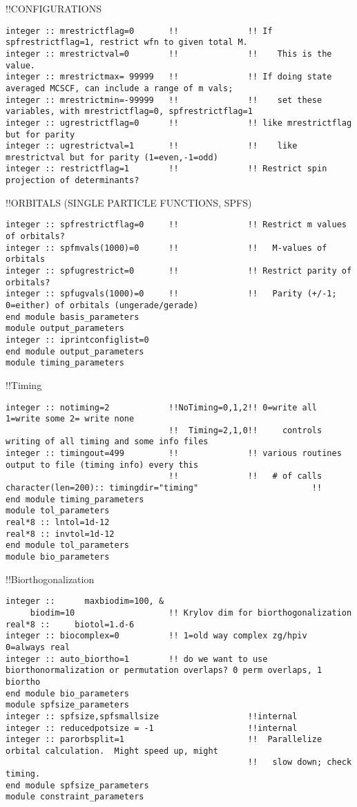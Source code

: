 !!{\large \quad CONFIGURATIONS}
\begin{verbatim}
integer :: mrestrictflag=0       !!              !! If spfrestrictflag=1, restrict wfn to given total M.
integer :: mrestrictval=0        !!              !!    This is the value.
integer :: mrestrictmax= 99999   !!              !! If doing state averaged MCSCF, can include a range of m vals;
integer :: mrestrictmin=-99999   !!              !!    set these variables, with mrestrictflag=0, spfrestrictflag=1
integer :: ugrestrictflag=0      !!              !! like mrestrictflag but for parity
integer :: ugrestrictval=1       !!              !!    like mrestrictval but for parity (1=even,-1=odd)
integer :: restrictflag=1        !!              !! Restrict spin projection of determinants?
\end{verbatim}
!!{\large \quad ORBITALS (SINGLE PARTICLE FUNCTIONS, SPFS)}
\begin{verbatim}
integer :: spfrestrictflag=0     !!              !! Restrict m values of orbitals?  
integer :: spfmvals(1000)=0      !!              !!   M-values of orbitals 
integer :: spfugrestrict=0       !!              !! Restrict parity of orbitals? 
integer :: spfugvals(1000)=0     !!              !!   Parity (+/-1; 0=either) of orbitals (ungerade/gerade)
end module basis_parameters
module output_parameters
integer :: iprintconfiglist=0
end module output_parameters
module timing_parameters
\end{verbatim}
!!{\large \quad Timing}
\begin{verbatim}
integer :: notiming=2            !!NoTiming=0,1,2!! 0=write all 1=write some 2= write none
                                 !!  Timing=2,1,0!!     controls writing of all timing and some info files
integer :: timingout=499         !!              !! various routines output to file (timing info) every this 
                                 !!              !!   # of calls
character(len=200):: timingdir="timing"                       !!
end module timing_parameters
module tol_parameters
real*8 :: lntol=1d-12
real*8 :: invtol=1d-12
end module tol_parameters
module bio_parameters
\end{verbatim}
!!{\large \quad Biorthogonalization }
\begin{verbatim}
integer ::      maxbiodim=100, &
     biodim=10                   !! Krylov dim for biorthogonalization
real*8 ::     biotol=1.d-6
integer :: biocomplex=0          !! 1=old way complex zg/hpiv  0=always real
integer :: auto_biortho=1        !! do we want to use biorthonormalization or permutation overlaps? 0 perm overlaps, 1 biortho
end module bio_parameters
module spfsize_parameters
integer :: spfsize,spfsmallsize                  !!internal
integer :: reducedpotsize = -1                   !!internal
integer :: parorbsplit=1                         !!  Parallelize orbital calculation.  Might speed up, might
                                                 !!   slow down; check timing.
end module spfsize_parameters
module constraint_parameters
\end{verbatim}
